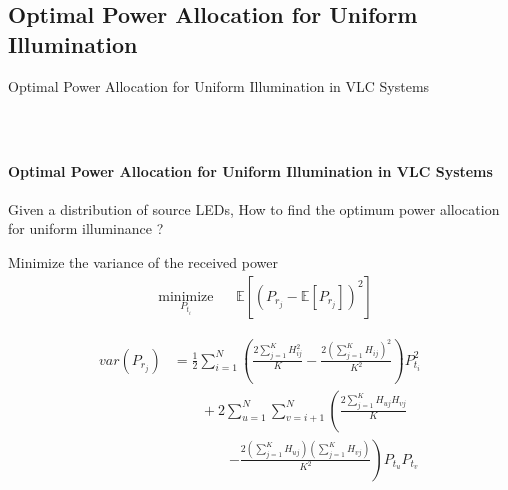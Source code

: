 \documentclass{beamer}
\providecommand{\sbrak}[1]{\ensuremath{{}\left[#1\right]}}
\providecommand{\brak}[1]{\ensuremath{\left(#1\right)}}
\providecommand{\lbrak}[1]{\ensuremath{\left(#1\right.}}
\providecommand{\rbrak}[1]{\ensuremath{\left.#1\right)}}
\theoremstyle{remark}
\begin{document}
\subsection{Optimal Power Allocation for Uniform Illumination}
\begin{frame}
\centering
\vfill
Optimal Power Allocation for Uniform Illumination in VLC Systems
\vfill
\end{frame}
\begin{frame}
\frametitle{\,}
\framesubtitle{Optimal Power Allocation for Uniform Illumination in VLC Systems}
\begin{list}{}{}
\vfill
\item<1-> Given a distribution of source LEDs, How to find the optimum power allocation for uniform illuminance ?  \\ 
\vfill
\vspace{.2in}
\item<2-> Minimize the variance of the received power
\begin{equation}
\begin{aligned}
& \underset{P_{t_i}}{\text{minimize}}
& & \mathbb{E}\sbrak{\brak{P_{r_j}-\mathbb{E}\sbrak{P_{r_j}}}^2} \nonumber
\end{aligned}
\end{equation}
\vfill
\item<3-> 
\footnotesize{
\begin{align}
var(P_{r_j})&=\frac{1}{2}\sum_{i=1}^N \brak{\frac{2\sum_{j=1}^KH_{ij}^2}{K}-\frac{2\brak{\sum_{j=1}^KH_{ij}}^2}{K^2}} P_{t_i}^2 \nonumber \\
            &\qquad + 2 \sum_{u=1}^N \sum_{v=i+1}^{N} \lbrak{\frac{2\sum_{j=1}^KH_{uj}H_{vj}}{K} } \nonumber \\
             &\qquad\qquad \rbrak{-\frac{2\brak{\sum_{j=1}^KH_{uj}}\brak{\sum_{j=1}^KH_{vj}}}{K^2}} P_{t_u}P_{t_v} \nonumber
\end{align}
}
\vfill
\end{list} 
\end{frame}
\end{document}
